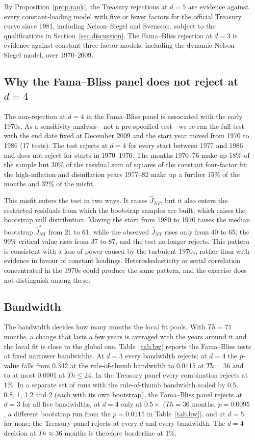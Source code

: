\documentclass[11pt]{article}
\begin{document}
By Proposition~\ref{prop.rank}, the Treasury rejections at $d=5$ are evidence against every constant-loading model with five or fewer factors for the official Treasury curve since 1981, including Nelson--Siegel and Svensson, subject to the qualifications in Section~\ref{sec.discussion}. The Fama--Bliss rejection at $d=3$ is evidence against constant three-factor models, including the dynamic Nelson--Siegel model, over 1970--2009.

\subsection{Why the Fama--Bliss panel does not reject at $d=4$}

The non-rejection at $d=4$ in the Fama--Bliss panel is associated with the early 1970s. As a sensitivity analysis---not a pre-specified test---we re-ran the full test with the end date fixed at December 2009 and the start year moved from 1970 to 1986 (17 tests). The test rejects at $d=4$ for every start between 1977 and 1986 and does not reject for starts in 1970--1976. The months 1970--76 make up 18\% of the sample but 30\% of the residual sum of squares of the constant four-factor fit; the high-inflation and disinflation years 1977--82 make up a further 15\% of the months and 32\% of the misfit.

This misfit enters the test in two ways. It raises $\hat J_{NT}$, but it also enters the restricted residuals from which the bootstrap samples are built, which raises the bootstrap null distribution. Moving the start from 1980 to 1970 raises the median bootstrap $\hat J^*_{NT}$ from 21 to 61, while the observed $\hat J_{NT}$ rises only from 40 to 65; the 99\% critical value rises from 37 to 87, and the test no longer rejects. This pattern is consistent with a loss of power caused by the turbulent 1970s, rather than with evidence in favour of constant loadings. Heteroskedasticity or serial correlation concentrated in the 1970s could produce the same pattern, and the exercise does not distinguish among these.

\subsection{Bandwidth}

The bandwidth decides how many months the local fit pools. With $Th=71$ months, a change that lasts a few years is averaged with the years around it and the local fit is close to the global one. Table~\ref{tab.bw} reports the Fama--Bliss tests at fixed narrower bandwidths. At $d=3$ every bandwidth rejects; at $d=4$ the $p$-value falls from 0.342 at the rule-of-thumb bandwidth to 0.0115 at $Th=36$ and to at most 0.0001 at $Th\le 24$. In the Treasury panel every combination rejects at 1\%. In a separate set of runs with the rule-of-thumb bandwidth scaled by 0.5, 0.8, 1, 1.2 and 2 (each with its own bootstrap), the Fama--Bliss panel rejects at $d=3$ for all five bandwidths, at $d=4$ only at $0.5\times$ ($Th=36$ months, $p=0.0095$, a different bootstrap run from the $p=0.0115$ in Table~\ref{tab.bw}), and at $d=5$ for none; the Treasury panel rejects at every $d$ and every bandwidth. The $d=4$ decision at $Th\approx36$ months is therefore borderline at 1\%.
\end{document}
